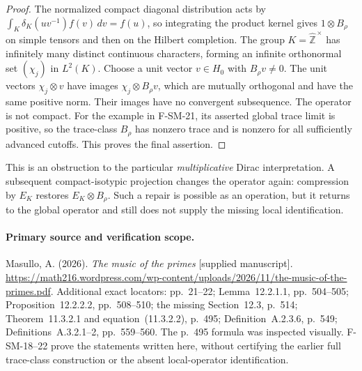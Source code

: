 \begin{proof}
The normalized compact diagonal distribution acts by
$\int_K\delta_K(uv^{-1})f(v)\,dv=f(u)$, so integrating
the product kernel gives $1\otimes B_\rho$ on simple
tensors and then on the Hilbert completion.
The group $K=\widehat{\mathbb Z}^{\,\times}$ has infinitely
many distinct continuous characters, forming an infinite
orthonormal set $(\chi_j)$ in $L^2(K)$.
Choose a unit vector $v\in H_0$ with $B_\rho v\ne0$.
The unit vectors $\chi_j\otimes v$ have images
$\chi_j\otimes B_\rho v$, which are mutually orthogonal
and have the same positive norm.  Their images have no
convergent subsequence.  The operator is not compact.
For the example in F-SM-21, its asserted global trace
limit is positive, so the trace-class $B_\rho$ has
nonzero trace and is nonzero for all sufficiently
advanced cutoffs.  This proves the final assertion.
\end{proof}

This is an obstruction to the particular \emph{multiplicative}
Dirac interpretation.  A subsequent compact-isotypic
projection changes the operator again: compression by $E_K$
restores $E_K\otimes B_\rho$.  Such a repair is possible
as an operation, but it returns to the global operator
and still does not supply the missing local identification.

\paragraph{Primary source and verification scope.}
Masullo, A. (2026). \emph{The music of the primes}
[supplied manuscript].
\url{https://math216.wordpress.com/wp-content/uploads/2026/11/the-music-of-the-primes.pdf}.
Additional exact locators: pp.~21--22; Lemma~12.2.1.1,
pp.~504--505; Proposition~12.2.2.2, pp.~508--510;
the missing Section~12.3, p.~514;
Theorem~11.3.2.1 and equation~(11.3.2.2), p.~495;
Definition~A.2.3.6, p.~549; Definitions~A.3.2.1--2,
pp.~559--560.  The p.~495 formula was inspected visually.
F-SM-18--22 prove the statements written here, without
certifying the earlier full trace-class construction or the
absent local-operator identification.
